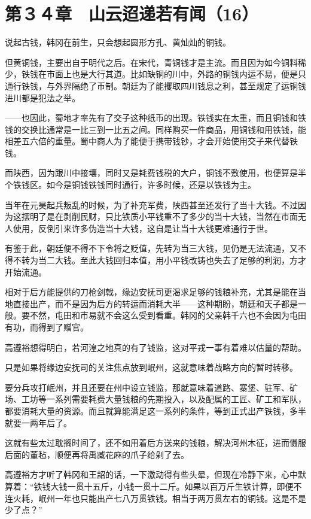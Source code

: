 \section{第３４章　山云迢递若有闻（16）}

说起古钱，韩冈在前生，只会想起圆形方孔、黄灿灿的铜钱。

但黄铜钱，主要出自于明代之后。在宋代，青铜钱才是主流。而且因为如今铜料稀少，铁钱在市面上也是大行其道。比如缺铜的川中，外路的铜钱内运不易，便是只通行铁钱，与外界隔绝了币制。朝廷为了能攫取四川钱息之利，甚至规定了运铜钱进川都是犯法之举。

——也因此，蜀地才率先有了交子这种纸币的出现。铁钱实在太重，而且铜钱和铁钱的交换比通常是一比三到一比五之间。同样购买一件商品，用铜钱和用铁钱，能相差五六倍的重量。蜀中商人为了能便于携带钱钞，才会开始使用交子来代替铁钱。

而陕西，因为跟川中接壤，同时又是耗费钱税的大户，铜钱不敷使用，也便算是半个铁钱区。如今是铜钱铁钱同时通行，许多时候，还是以铁钱为主。

当年在元昊起兵叛乱的时候，为了补充军费，陕西甚至还发行了当十大钱。不过因为这摆明了是在剥削民财，只比铁质小平钱重不了多少的当十大钱，当然在市面无人使用，反倒引来许多伪造当十大钱，这自是让当十大钱更难通行于世。

有鉴于此，朝廷便不得不下令将之贬值，先转为当三大钱，见仍是无法流通，又不得不转为当二大钱。至此大钱回归本值，用小平钱改铸也失去了足够的利润，方才开始流通。

相对于后方能提供的刀枪剑戟，缘边安抚司更渴求足够的钱粮补充，尤其是能在当地直接出产，而不是因为后方的转运而消耗大半——这种期盼，朝廷和天子都是一般。要不然，屯田和市易就不会这么受到看重。韩冈的父亲韩千六也不会因为屯田有功，而得到了赠官。

高遵裕想得明白，若河湟之地真的有了钱监，这对平戎一事有着难以估量的帮助。

只是如果将缘边安抚司的关注焦点放到岷州，这就意味着战略方向的暂时转移。

要分兵攻打岷州，并且还要在州中设立钱监，那就意味着道路、寨堡、驻军、矿场、工坊等一系列需要耗费大量钱粮的先期投入，以及配属的工匠、矿工和军队，都要消耗大量的资源。而且就算能满足这一系列的条件，等到正式出产铁钱，多半就要一两年后了。

这就有些太过耽搁时间了，还不如用着后方送来的钱粮，解决河州木征，进而慑服后面的董毡，顺便再将禹臧花麻的爪子给剁了去。

高遵裕方才听了韩冈和王韶的话，一下激动得有些头晕，但现在冷静下来，心中默算着：“铁钱大钱一贯十五斤，小钱一贯十二斤。如果以百万斤生铁计算，即便不连火耗，岷州一年也只能出产七八万贯铁钱。相当于两万贯左右的铜钱。这是不是少了点？”

